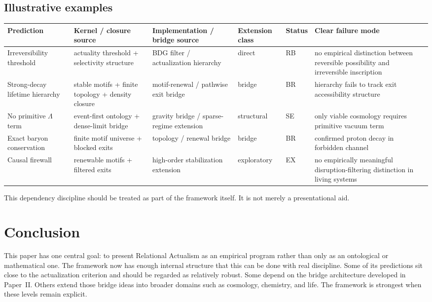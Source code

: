 \documentclass[11pt]{article}
\begin{document}
\subsection{Illustrative examples}
\begin{longtable}{>{\raggedright\arraybackslash}p{3.2cm} >{\raggedright\arraybackslash}p{2.3cm} >{\raggedright\arraybackslash}p{2.3cm} >{\raggedright\arraybackslash}p{2.3cm} >{\raggedright\arraybackslash}p{1.5cm} >{\raggedright\arraybackslash}p{3.0cm}}
\toprule
Prediction & Kernel / closure source & Implementation / bridge source & Extension class & Status & Clear failure mode \\
\midrule
Irreversibility threshold & actuality threshold + selectivity structure & BDG filter / actualization hierarchy & direct & RB & no empirical distinction between reversible possibility and irreversible inscription \\
Strong-decay lifetime hierarchy & stable motifs + finite topology + density closure & motif-renewal / pathwise exit bridge & bridge & BR & hierarchy fails to track exit accessibility structure \\
No primitive $\Lambda$ term & event-first ontology + dense-limit bridge & gravity bridge / sparse-regime extension & structural & SE & only viable cosmology requires primitive vacuum term \\
Exact baryon conservation & finite motif universe + blocked exits & topology / renewal bridge & bridge & BR & confirmed proton decay in forbidden channel \\
Causal firewall & renewable motifs + filtered exits & high-order stabilization extension & exploratory & EX & no empirically meaningful disruption-filtering distinction in living systems \\
\bottomrule
\end{longtable}

This dependency discipline should be treated as part of the framework itself. It is not merely a presentational aid.

\section{Conclusion}\label{sec:conclusion}
This paper has one central goal: to present Relational Actualism as an empirical program rather than only as an ontological or mathematical one. The framework now has enough internal structure that this can be done with real discipline. Some of its predictions sit close to the actualization criterion and should be regarded as relatively robust. Some depend on the bridge architecture developed in Paper~II. Others extend those bridge ideas into broader domains such as cosmology, chemistry, and life. The framework is strongest when these levels remain explicit.
\end{document}
